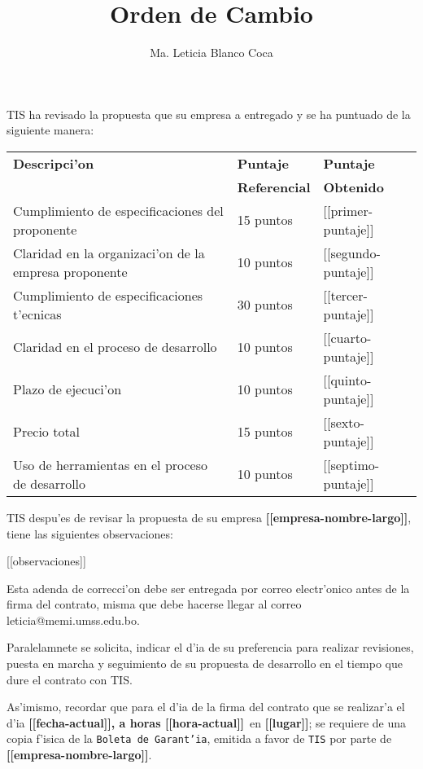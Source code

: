 \documentclass[10pt,letterpaper,twoside]{article}
\newcommand{\empresa}[0]{\textbf{[[empresa-nombre-largo]]}}
\newcommand{\diayhora}[0]{\textbf{[[fecha-actual]], a horas [[hora-actual]]}}
\newcommand{\lugar}[0]{\textbf{[[lugar]]}}
\newcommand{\pp}[0]{[[primer-puntaje]]}
\newcommand{\sep}[0]{[[segundo-puntaje]]}
\newcommand{\tp}[0]{[[tercer-puntaje]]}
\newcommand{\cp}[0]{[[cuarto-puntaje]]}
\newcommand{\qp}[0]{[[quinto-puntaje]]}
\newcommand{\ssp}[0]{[[sexto-puntaje]]}
\newcommand{\sssp}[0]{[[septimo-puntaje]]}
\begin{document}
\title{Orden de Cambio}
\author{Ma. Leticia Blanco Coca}
\maketitle


TIS ha revisado la propuesta que su empresa a entregado y se ha puntuado de la siguiente manera:

\begin{tabular}{|l|l|l|}
\hline \textbf{Descripci'on}& \textbf{Puntaje}&\textbf{Puntaje} \\
& \textbf{Referencial}&\textbf{Obtenido} \\
\hline Cumplimiento de especificaciones del proponente       & 15 puntos & \pp \\
\hline Claridad en la organizaci'on de la empresa proponente & 10 puntos & \sep \\
\hline Cumplimiento de especificaciones t'ecnicas            & 30 puntos & \tp \\ 
\hline Claridad en el proceso de desarrollo                  & 10 puntos & \cp \\
\hline Plazo de ejecuci'on                                   & 10 puntos & \qp \\
\hline Precio total                                          & 15 puntos & \ssp \\
\hline Uso de herramientas en el proceso de desarrollo       & 10 puntos & \sssp \\
\hline
\end{tabular}

TIS despu'es de revisar la propuesta de su empresa \empresa, tiene las siguientes observaciones:

[[observaciones]]

Esta adenda de correcci'on debe ser entregada por correo electr'onico antes de la firma del contrato, misma que debe hacerse llegar al correo leticia@memi.umss.edu.bo.


Paralelamnete se solicita, indicar el d'ia de su preferencia para realizar revisiones, puesta
en marcha  y 
seguimiento de su propuesta de desarrollo en el tiempo que dure el contrato con TIS.


As'imismo, recordar que para el d'ia de la firma del contrato que se realizar'a el d'ia \diayhora\ en \lugar; se requiere de una copia f'isica
 de la 
\texttt{Boleta de Garant'ia}, emitida a favor de \texttt{TIS} por parte de \empresa.
\end{document}
